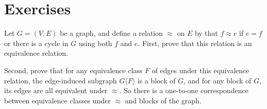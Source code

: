 \documentclass[nobib]{tufte-handout}
\begin{document}
\section{Exercises}

\begin{xca}
  Let $G = (V,E)$ be a graph, and define a relation $\approx$ on $E$ by that $f \approx e$ if $e = f$ or there is a cycle in $G$ using both $f$ and $e$. First, prove that this relation is an equivalence relation.

  Second, prove that for any equivalence class $F$ of edges under this equivalence relation, the edge-induced subgraph $G\langle F\rangle$ is a block of $G$, and for any block of $G$, its edges are all equivalent under $\approx$. So there is a one-to-one correspondence between equivalence classes under $\approx$ and blocks of the graph.
\end{xca}

%
%
\end{document}
